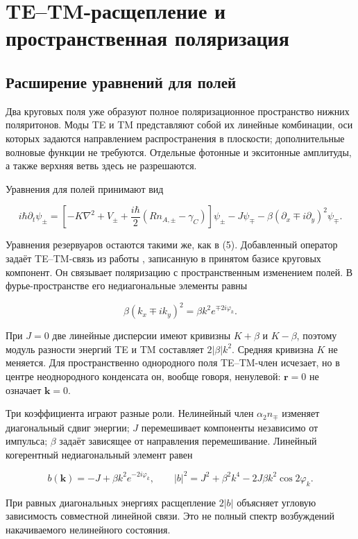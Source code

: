\documentclass[12pt,a4paper]{article}
\begin{document}
\section{TE--TM-расщепление и пространственная поляризация}

\subsection{Расширение уравнений для полей}

Два круговых поля уже образуют полное поляризационное пространство нижних поляритонов. Моды TE и TM представляют собой их линейные комбинации, оси которых задаются направлением распространения в плоскости; дополнительные волновые функции не требуются. Отдельные фотонные и экситонные амплитуды, а также верхняя ветвь здесь не разрешаются.

Уравнения для полей принимают вид

\[
i\hbar\partial_t\psi_\pm=
\left[-K\nabla^2+V_\pm+\frac{i\hbar}{2}(Rn_{A,\pm}-\gamma_C)\right]\psi_\pm
-J\psi_\mp-\beta(\partial_x\mp i\partial_y)^2\psi_\mp.
\tag{15}\label{eq:15}
\]

Уравнения резервуаров остаются такими же, как в (5). Добавленный оператор задаёт TE--TM-связь из работы \cite{ref6}, записанную в принятом базисе круговых компонент. Он связывает поляризацию с пространственным изменением полей. В фурье-пространстве его недиагональные элементы равны

\[
\beta(k_x\mp ik_y)^2=\beta k^2e^{\mp2i\varphi_k}.
\tag{16}\label{eq:16}
\]

При \(J=0\) две линейные дисперсии имеют кривизны \(K+\beta\) и \(K-\beta\), поэтому модуль разности энергий TE и TM составляет \(2|\beta|k^2\). Средняя кривизна \(K\) не меняется. Для пространственно однородного поля TE--TM-член исчезает, но в центре неоднородного конденсата он, вообще говоря, ненулевой: \(\mathbf r=0\) не означает \(\mathbf k=0\).

Три коэффициента играют разные роли. Нелинейный член \(\alpha_2n_\mp\) изменяет диагональный сдвиг энергии; \(J\) перемешивает компоненты независимо от импульса; \(\beta\) задаёт зависящее от направления перемешивание. Линейный когерентный недиагональный элемент равен

\[
b(\mathbf k)=-J+\beta k^2e^{-2i\varphi_k},\qquad
|b|^2=J^2+\beta^2k^4-2J\beta k^2\cos2\varphi_k.
\tag{17}\label{eq:17}
\]

При равных диагональных энергиях расщепление \(2|b|\) объясняет угловую зависимость совместной линейной связи. Это не полный спектр возбуждений накачиваемого нелинейного состояния.
\end{document}
